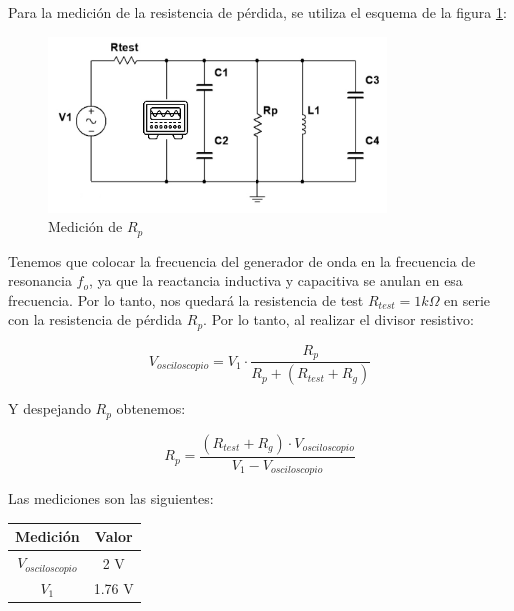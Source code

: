 Para la medición de la resistencia de pérdida, se utiliza el esquema de la figura \ref{fig: de la medición de la resistencia de pérdida}:

\begin{figure}[H]
    \centering
    \includegraphics[width=0.8\textwidth]{Imagenes/medicion_rp.png}
    \caption{Medición de $R_p$}
    \label{fig: de la medición de la resistencia de pérdida}
\end{figure}

Tenemos que colocar la frecuencia del generador de onda en la frecuencia de resonancia $f_o$, ya que la reactancia inductiva y capacitiva se anulan en esa frecuencia.
Por lo tanto, nos quedará la resistencia de test $R_{test} = 1k\Omega$ en serie con la resistencia de pérdida $R_p$. Por lo tanto, al realizar el divisor resistivo:

\begin{equation}
    V_{osciloscopio} = V_{1} \cdot \frac{R_p}{R_p + (R_{test}+ R_g)}
\end{equation}

Y despejando $R_p$ obtenemos:

\begin{equation}
    R_p = \frac{(R_{test} + R_g) \cdot V_{osciloscopio}}{V_{1} - V_{osciloscopio}}
\end{equation}

Las mediciones son las siguientes:



\begin{table}[H]
    \centering
    \begin{tabular}{|c|c|}
    \hline
    \rowcolor[HTML]{C0C0C0} 
    \textbf{Medición} & \textbf{Valor} \\ \hline
    $V_{osciloscopio}$            & 2 V         \\ \hline
    $V_{1}$         & 1.76 V         \\ \hline
    \end{tabular}
\end{table}


